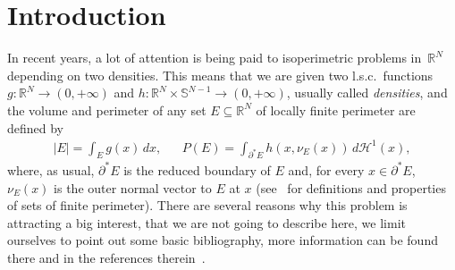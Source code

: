 \documentclass[11pt]{article}
\numberwithin{equation}{section}
\newcommand\R{\mathbb{R}}
\renewcommand\S{\mathbb{S}}
\renewcommand\H{\mathcal{H}}
\theoremstyle{plain}
\theoremstyle{definition}
\begin{document}

\section{Introduction}

In recent years, a lot of attention is being paid to isoperimetric problems in~$\R^N$ depending on two densities. This means that we are given two l.s.c.\ functions \hbox{$g:\R^N\to (0,+\infty)$} and $h:\R^N\times\S^{N-1}\to (0,+\infty)$, usually called \emph{densities}, and the volume and perimeter of any set $E\subseteq\R^N$ of locally finite perimeter are defined by
\begin{align}\label{weightedvolper}
|E| = \int_E g(x)\,dx, && P(E) = \int_{\partial^* E} h(x,\nu_E(x))\, d\H^1(x),
\end{align}
where, as usual, $\partial^* E$ is the reduced boundary of $E$ and, for every $x\in\partial^* E$, $\nu_E(x)$ is the outer normal vector to $E$ at $x$ (see~\cite{AFP} for definitions and properties of sets of finite perimeter). There are several reasons why this problem is attracting a big interest, that we are not going to describe here, we limit ourselves to point out some basic bibliography, more information can be found there and in the references therein~\cite{RCBM08,CMV10,CRS12,MP13,BBCLT16,ABCMP17,DFP,G18,ABCMP19,CGPRS20,FP20}.
\end{document}
